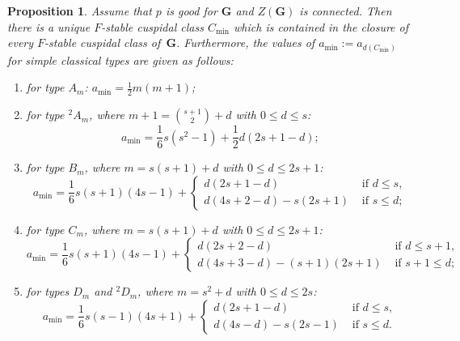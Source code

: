 \documentclass[12pt,leqno,a4paper]{amsart}
\newcommand{\bG}{{\mathbf{G}}}
\newcommand{\tw}[1]{{}^{#1}\!}
\newtheorem{prop}[thm]{Proposition}
\theoremstyle{remark}
\begin{document}
\begin{prop} \label{prop:bound a}
 Assume that $p$ is good for $\bG$ and $Z(\bG)$ is connected. Then there is a
 unique $F$-stable cuspidal class $C_{\min}$ which is contained in the closure
 of every $F$-stable cuspidal class of~$\bG$. Furthermore, the values of
 $a_{\min} := a_{d(C_{\min})}$ for simple classical types are given as follows:
 \begin{enumerate}
  \item[\rm(a)] for type $A_m$: $a_{\min} = \frac{1}{2}m(m+1)$;
  \item[\rm(b)] for type $\tw2A_m$, where $m+1=\binom{s+1}{2}+d$ with
   $0\le d\le s$:
   $$a_{\min} = \frac{1}{6}s(s^2-1)+\frac{1}{2}d(2s+1-d);$$
  \item[\rm(c)] for type $B_m$, where $m=s(s+1)+d$ with $0\le d\le 2s+1$:
   $$a_{\min} = \frac{1}{6}s(s+1)(4s-1)+\begin{cases}
    d(2s+1-d)& \text{ if $d\le s$},\\
    d(4s+2-d)-s(2s+1)& \text{ if $s\le d$};\end{cases}$$
  \item[\rm(d)] for type $C_m$, where $m=s(s+1)+d$ with $0\le d\le 2s+1$:
   $$a_{\min} =\frac{1}{6}s(s+1)(4s-1)+\begin{cases}
    d(2s+2-d)& \text{ if $d\le s+1$},\\
    d(4s+3-d)-(s+1)(2s+1)& \text{ if $s+1\le d$};\end{cases}$$
  \item[\rm(e)] for types $D_m$ and $\tw2D_m$, where $m=s^2+d$ with
   $0\le d\le 2s$:
   $$a_{\min} = \frac{1}{6}s(s-1)(4s+1)+\begin{cases}
    d(2s+1-d)& \text{ if $d\le s$},\\
    d(4s-d)-s(2s-1)& \text{ if $s\le d$}.\end{cases}$$
 \end{enumerate}
\end{prop}
\end{document}
